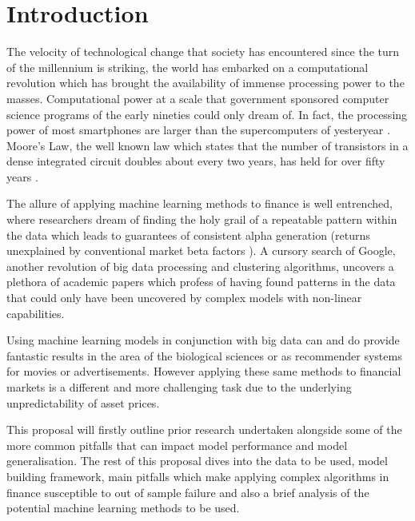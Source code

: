 \documentclass[11pt]{article}
\begin{document}
\clearpage

\tableofcontents

\clearpage


\section{Introduction}

The velocity of technological change that society has encountered since the turn of the millennium is striking, the world has embarked on a computational revolution which has brought the availability of immense processing power to the masses. Computational power at a scale that government sponsored computer science programs of the early nineties could only dream of. In fact, the processing power of most smartphones are larger than the supercomputers of yesteryear \cite{supercomp}.
\newline Moore's Law, the well known law which states that the number of transistors in a dense integrated circuit doubles about every two years, has held for over fifty years \cite{MacK2011}. 

\par
The allure of applying machine learning methods to finance is well entrenched, where researchers dream of finding the holy grail of a repeatable pattern within the data which leads to guarantees of consistent alpha generation (returns unexplained by conventional market beta factors \cite{Rebonato2017}). A cursory search of Google, another revolution of big data processing and clustering algorithms, uncovers a plethora of academic papers which profess of having found patterns in the data that could only have been uncovered by complex models with non-linear capabilities. \par Using machine learning models in conjunction with big data can and do provide fantastic results in the area of the biological sciences or as recommender systems for movies or advertisements. However applying these same methods to financial markets is a different and more challenging task due to the underlying unpredictability of asset prices.\par

This proposal will firstly outline prior research undertaken alongside some of the more common pitfalls that can impact model performance and model generalisation. The rest of this proposal dives into the data to be used, model building framework, main pitfalls which make applying complex algorithms in finance susceptible to out of sample failure \cite{LopezdePrado2018} and also a brief analysis of the potential machine learning methods to be used.
\par
\end{document}

